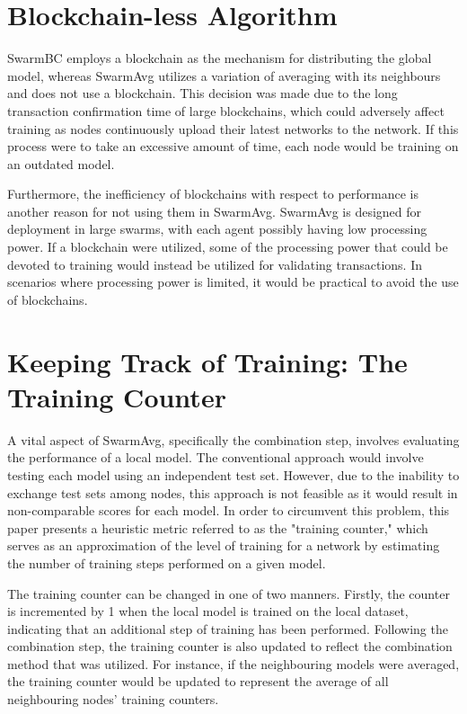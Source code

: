 \section{Blockchain-less Algorithm}
SwarmBC employs a blockchain as the mechanism for distributing the global model, whereas SwarmAvg utilizes a variation of averaging with its neighbours and does not use a blockchain. This decision was made due to the long transaction confirmation time of large blockchains, which could adversely affect training as nodes continuously upload their latest networks to the network. If this process were to take an excessive amount of time, each node would be training on an outdated model.

Furthermore, the inefficiency of blockchains with respect to performance is another reason for not using them in SwarmAvg. SwarmAvg is designed for deployment in large swarms, with each agent possibly having low processing power. If a blockchain were utilized, some of the processing power that could be devoted to training would instead be utilized for validating transactions. In scenarios where processing power is limited, it would be practical to avoid the use of blockchains.

\section{Keeping Track of Training: The Training Counter}
A vital aspect of SwarmAvg, specifically the combination step, involves evaluating the performance of a local model. The conventional approach would involve testing each model using an independent test set. However, due to the inability to exchange test sets among nodes, this approach is not feasible as it would result in non-comparable scores for each model. In order to circumvent this problem, this paper presents a heuristic metric referred to as the "training counter," which serves as an approximation of the level of training for a network by estimating the number of training steps performed on a given model.

The training counter can be changed in one of two manners. Firstly, the counter is incremented by 1 when the local model is trained on the local dataset, indicating that an additional step of training has been performed. Following the combination step, the training counter is also updated to reflect the combination method that was utilized. For instance, if the neighbouring models were averaged, the training counter would be updated to represent the average of all neighbouring nodes' training counters.

